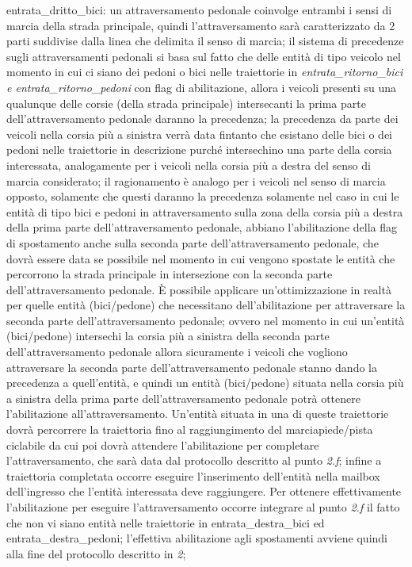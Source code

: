 \begin{enumerate}
\begin{enumerate}
\begin{itemize}
{en\-tra\-ta\_drit\-to\_bi\-ci}: un attraversamento pedonale coinvolge entrambi i sensi di marcia della strada principale, quindi l'attraversamento sarà caratterizzato da 2 parti suddivise dalla linea che delimita il senso di marcia; il sistema di precedenze sugli attraversamenti pedonali si basa sul fatto che delle entità di tipo veicolo nel momento in cui ci siano dei pedoni o bici nelle traiettorie in \textit{en\-tra\-ta\_ri\-tor\-no\_bi\-ci e en\-tra\-ta\_ri\-tor\-no\_pe\-do\-ni} con flag di abilitazione, allora i veicoli presenti su una qualunque delle corsie (della strada principale) intersecanti la prima parte dell'attraversamento pedonale daranno la precedenza; la precedenza da parte dei veicoli nella corsia più a sinistra verrà data fintanto che esistano delle bici o dei pedoni nelle traiettorie in descrizione purché intersechino una parte della corsia interessata, analogamente per i veicoli nella corsia più a destra del senso di marcia considerato; il ragionamento è analogo per i veicoli nel senso di marcia opposto, solamente che questi daranno la precedenza solamente nel caso in cui le entità di tipo bici e pedoni in attraversamento sulla zona della corsia più a destra della prima parte dell'attraversamento pedonale, abbiano l'abilitazione della flag di spostamento anche sulla seconda parte dell'attraversamento pedonale, che dovrà essere data se possibile nel momento in cui vengono spostate le entità che percorrono la strada principale in intersezione con la seconda parte dell'attraversamento pedonale. È possibile applicare un'ottimizzazione in realtà per quelle entità (bici/pedone) che necessitano dell'abilitazione per attraversare la seconda parte dell'attraversamento pedonale; ovvero nel momento in cui un'entità (bici/pedone) intersechi la corsia più a sinistra della seconda parte dell'attraversamento pedonale allora sicuramente i veicoli che vogliono attraversare la seconda parte dell'attraversamento pedonale stanno dando la precedenza a quell'entità, e quindi un entità (bici/pedone) situata nella corsia più a sinistra della prima parte dell'attraversamento pedonale potrà ottenere l'abilitazione all'attraversamento. Un'entità situata in una di queste traiettorie dovrà percorrere la traiettoria fino al raggiungimento del marciapiede/pista ciclabile da cui poi dovrà attendere l'abilitazione per completare l'attraversamento, che sarà data dal protocollo descritto al punto \textit{2.f}; infine a traiettoria completata occorre eseguire l'inserimento dell'entità nella mailbox dell'ingresso che l'entità interessata deve raggiungere. Per ottenere effettivamente l'abilitazione per eseguire l'attraversamento occorre integrare al punto \textit{2.f} il fatto che non vi siano entità nelle traiettorie in en\-tra\-ta\_des\-tra\_bi\-ci ed en\-tra\-ta\_des\-tra\_pe\-do\-ni; l'effettiva abilitazione agli spostamenti avviene quindi alla fine del protocollo descritto in \textit{2};

\end{itemize}
\end{enumerate}
\end{enumerate}
